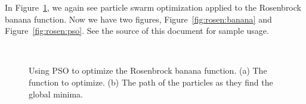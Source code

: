 \documentclass[master]{thesis}
\newcommand{\fref}[1]{Figure~\ref{#1}}   %
\begin{document}
In \fref{fig:pso.subfloat}, we again see particle swarm optimization applied to the Rosenbrock banana function.  Now we have two figures, \fref{fig:rosen:banana} and \fref{fig:rosen:pso}.  See the source of this document for sample usage.

\vspace{-1em}
\begin{figure}[p!] %
     \\


    \caption[Using PSO to optimize the Rosenbrock banana function.]{Using PSO to optimize the Rosenbrock banana function.  (a)  The function to optimize.  (b)  The path of the particles as they find the global minima.}

    \label{fig:pso.subfloat}
\end{figure}
\end{document}
